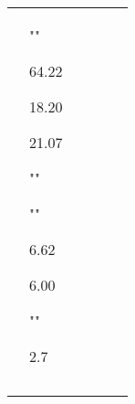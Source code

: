 \documentclass[10pt,a4paper]{report}
\begin{document}
\begin{longtable}{p{5cm} p{1cm} p{1cm} p{1cm} p{1cm} p{1cm}}
&  
\par ""
\par 64.22
\par 18.20
\par 21.07
\par ""
\par ""
\par 6.62
\par 6.00
\par ""
\par 2.7

&  &  &   \\
 \\
\hline 
\hline \\[-1.8ex] 

\end{longtable} 
\end{document}
